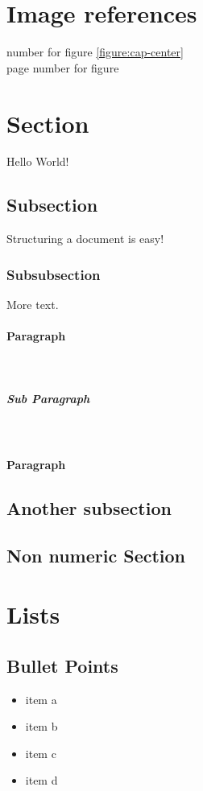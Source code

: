 \documentclass[12pt]{article}
\begin{document}
\pagebreak
\section{Image references}

number for figure \ref{figure:cap-center} \\
page number for figure \pageref{figure:cap-center}

\section{Section}

Hello World!

\subsection{Subsection}

Structuring a document is easy!

\subsubsection{Subsubsection}

More text.

\paragraph{Paragraph}
\lipsum[1]\\

\subparagraph{Sub Paragraph}
\lipsum[1]\\

\paragraph{Paragraph}
\lipsum[1]

\subsection{Another subsection}

\subsection*{Non numeric Section}

\pagebreak
\section{Lists}

\subsection*{Bullet Points}
\begin{itemize}
\item item a
\item item b
\item item c
\item item d
\end{itemize}
\end{document}
